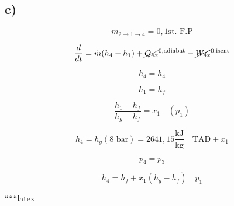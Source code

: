 

\subsection*{c)}

\[
\dot{m}_{2 \rightarrow 1 \rightarrow 4} = 0, \text{1st. F.P}
\]

\[
\frac{d}{dt} = \dot{m} (h_4 - h_1) + \cancel{Q_{4x}}^{0, \text{adiabat}} - \cancel{W_{4x}}^{0, \text{isent}}
\]

\[
h_4 = h_4
\]

\[
h_1 = h_f
\]

\[
\frac{h_1 - h_f}{h_g - h_f} = x_1 \quad (p_1)
\]

\[
h_4 = h_g (8 \text{ bar}) = 2641,15 \frac{\text{kJ}}{\text{kg}} \quad \text{TAD} + x_1
\]

\[
p_4 = p_3
\]

\[
h_4 = h_f + x_1 (h_g - h_f) \quad p_1
\]

``````latex